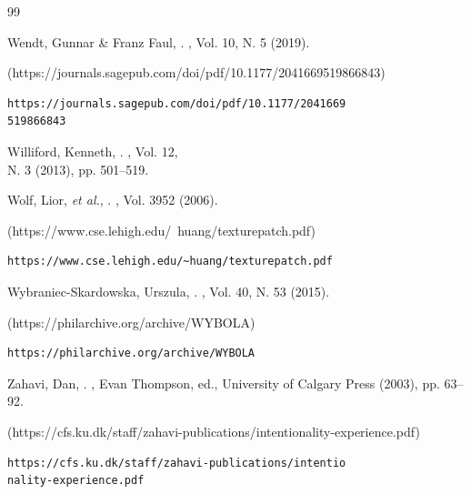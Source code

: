 \begin{thebibliography}{99}
{\begin{bItem}[WendtFaul]
Wendt, Gunnar \& Franz Faul,
.
, Vol. 10, N. 5 (2019).
%
\begin{boxurl}(https://journals.sagepub.com/doi/pdf/10.1177/2041669519866843)
\begin{lstlisting}
https://journals.sagepub.com/doi/pdf/10.1177/2041669
519866843
\end{lstlisting}
\end{boxurl}\end{bItem}




\begin{bItem}[KennethWilliford]
Williford, Kenneth,%
.
,
Vol. 12,\\N. 3 (2013), pp. 501--519.\hspace*{-5pt}
\end{bItem}




\begin{bItem}[Wolfetal]
Wolf, Lior, \textit{et al.},
.  
,
Vol. 3952 (2006).
%
\begin{boxurl}(https://www.cse.lehigh.edu/~huang/texturepatch.pdf)
\begin{lstlisting}
https://www.cse.lehigh.edu/~huang/texturepatch.pdf
\end{lstlisting}
\end{boxurl}\end{bItem}




\begin{bItem}[WybraniecSkardowska]
Wybraniec-Skardowska, Urszula, 
.  
,
Vol. 40, N. 53 (2015).
%
\begin{boxurl}(https://philarchive.org/archive/WYBOLA)
\begin{lstlisting}
https://philarchive.org/archive/WYBOLA
\end{lstlisting}
\end{boxurl}\end{bItem}




\begin{bItem}[DanZahavi]
Zahavi, Dan, 
.
, 
Evan Thompson, ed., University of Calgary Press (2003), pp. 63--92.
%
\begin{boxurl}(https://cfs.ku.dk/staff/zahavi-publications/intentionality-experience.pdf)
\begin{lstlisting}
https://cfs.ku.dk/staff/zahavi-publications/intentio
nality-experience.pdf
\end{lstlisting}
\end{boxurl}\end{bItem}

}
\end{thebibliography}
